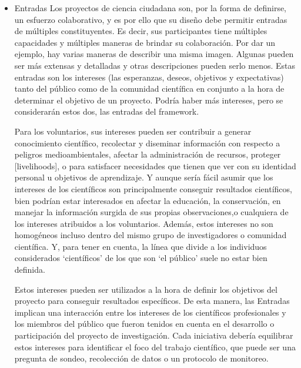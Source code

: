 \begin{itemize}
	\item {Entradas}
		Los proyectos de ciencia ciudadana son, por la forma de definirse, un esfuerzo colaborativo, y es por ello que su diseño debe permitir entradas de múltiples constituyentes. Es decir, sus participantes tiene múltiples capacidades y múltiples maneras de brindar su colaboración. Por dar un ejemplo, hay varias maneras de describir una misma imagen. Algunas pueden ser más extensas y detalladas y otras descripciones pueden serlo menos. Estas entradas son los intereses (las esperanzas, deseos, objetivos y expectativas) tanto del público como de la comunidad científica en conjunto a la hora de determinar el objetivo de un proyecto. Podría haber más intereses, pero se considerarán estos dos, las entradas del framework.
		
		Para los voluntarios, sus intereses pueden ser contribuir a generar conocimiento científico, recolectar y diseminar información con respecto a peligros medioambientales, afectar la administración de recursos, proteger [livelihoods], o para satisfacer necesidades que tienen que ver con su identidad personal u objetivos de aprendizaje. Y aunque sería fácil asumir que los intereses de los científicos son principalmente conseguir resultados científicos, bien podrían estar interesados en afectar la educación, la conservación, en manejar la información surgida de sus propias observaciones,o cualquiera de los intereses atribuidos a los voluntarios. Además, estos intereses no son homogéneos incluso dentro del mismo grupo de investigadores o comunidad científica. Y, para tener en cuenta, la línea que divide a los individuos considerados `científicos' de los que son `el público' suele no estar bien definida.
		
		Estos intereses pueden ser utilizados a la hora de definir los objetivos del proyecto para conseguir resultados específicos. De esta manera, las Entradas implican una interacción entre los intereses de los científicos profesionales y los miembros del público que fueron tenidos en cuenta en el desarrollo o participación del proyecto de investigación. Cada iniciativa debería equilibrar estos intereses para identificar el foco del trabajo científico, que puede ser una pregunta de sondeo, recolección de datos o un protocolo de monitoreo.
		

\end{itemize}
